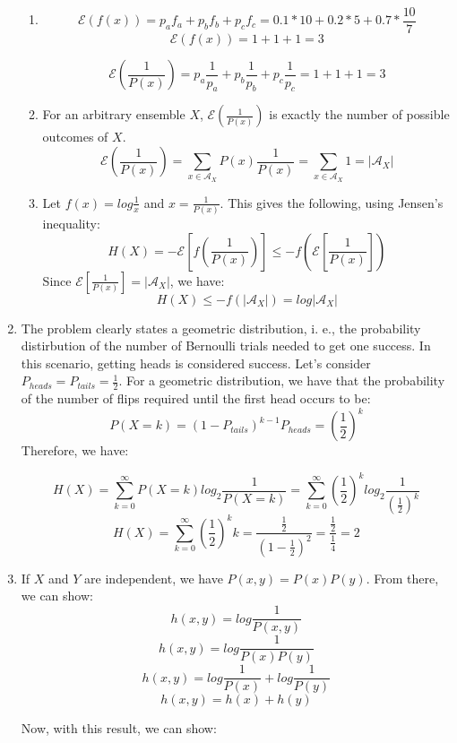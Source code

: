 \documentclass{article}
\begin{document}
\begin{enumerate}
\begin{enumerate}
		      \item
		            \[\mathcal{E}(f(x)) = p_a f_a + p_b f_b + p_c f_c = 0.1 * 10 + 0.2 * 5 + 0.7 * \frac{10}{7}\]
		            \[\mathcal{E}(f(x)) = 1 + 1 + 1 = 3\]

		            \[\mathcal{E}(\frac{1}{P(x)}) = p_a \frac{1}{p_a} + p_b \frac{1}{p_b} + p_c \frac{1}{p_c} = 1 + 1 + 1 = 3\]

		      \item For an arbitrary ensemble \(X\), \(\mathcal{E}(\frac{1}{P(x)})\) is exactly the number of possible outcomes of \(X\).
		            \[\mathcal{E}(\frac{1}{P(x)}) = \sum_{x \in \mathcal{A}_X} P(x) \frac{1}{P(x)} = \sum_{x \in \mathcal{A}_X} 1 = |\mathcal{A}_X|\]

		      \item Let \(f(x) = log \frac{1}{x}\) and \(x = \frac{1}{P(x)}\). This gives the following, using Jensen's inequality:
		            \[H(X) = -\mathcal{E}[f(\frac{1}{P(x)})] \leq -f(\mathcal{E}[\frac{1}{P(x)}])\]
		            Since \(\mathcal{E}[\frac{1}{P(x)}] = |\mathcal{A}_X|\), we have:
		            \[H(X) \leq -f(|\mathcal{A}_X|) = log |\mathcal{A}_X|\]
	      \end{enumerate}

	\item The problem clearly states a geometric distribution, i. e., the probability distirbution of the number of Bernoulli trials needed to get one success. In this scenario, getting heads is considered success. Let's consider \(P_{heads} = P_{tails} = \frac{1}{2}\). For a geometric distribution, we have that the probability of the number of flips required until the first head occurs to be:
	      \[P(X = k) = (1 - P_{tails})^{k-1} P_{heads} = (\frac{1}{2})^k\]
	      Therefore, we have:

	      \[H(X) = \sum_{k=0}^{\infty} P(X = k) log_2 \frac{1}{P(X = k)} = \sum_{k=0}^{\infty} (\frac{1}{2})^k log_2 \frac{1}{(\frac{1}{2})^k}\]
	      \[H(X) = \sum_{k=0}^{\infty} (\frac{1}{2})^k k = \frac{\frac{1}{2}}{(1 - \frac{1}{2})^2} = \frac{\frac{1}{2}}{\frac{1}{4}} = 2\]

	\item If \(X\) and \(Y\) are independent, we have \(P(x, y) = P(x)P(y)\). From there, we can show:
	      \[h(x, y) = log \frac{1}{P(x, y)}\]
	      \[h(x, y) = log \frac{1}{P(x)P(y)}\]
	      \[h(x, y) = log \frac{1}{P(x)} + log \frac{1}{P(y)}\]
	      \[h(x, y) = h(x) + h(y)\]

	      Now, with this result, we can show:


\end{enumerate}
\end{document}
